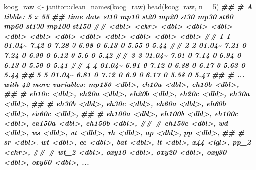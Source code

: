 \documentclass[
]{article}
\newenvironment{Shaded}{\begin{snugshade}}{\end{snugshade}}
\newcommand{\AttributeTok}[1]{\textcolor[rgb]{0.77,0.63,0.00}{#1}}
\newcommand{\DecValTok}[1]{\textcolor[rgb]{0.00,0.00,0.81}{#1}}
\newcommand{\DocumentationTok}[1]{\textcolor[rgb]{0.56,0.35,0.01}{\textbf{\textit{#1}}}}
\newcommand{\FunctionTok}[1]{\textcolor[rgb]{0.00,0.00,0.00}{#1}}
\newcommand{\NormalTok}[1]{#1}
\newcommand{\OtherTok}[1]{\textcolor[rgb]{0.56,0.35,0.01}{#1}}
\newcommand{\SpecialCharTok}[1]{\textcolor[rgb]{0.00,0.00,0.00}{#1}}
\begin{document}
\begin{Shaded}
\begin{Highlighting}[]
\NormalTok{koog\_raw }\OtherTok{\textless{}{-}}\NormalTok{ janitor}\SpecialCharTok{::}\FunctionTok{clean\_names}\NormalTok{(koog\_raw)}
\FunctionTok{head}\NormalTok{(koog\_raw, }\AttributeTok{n =} \DecValTok{5}\NormalTok{)}
\DocumentationTok{\#\# \# A tibble: 5 x 55}
\DocumentationTok{\#\#    time date    st10  mp10  st20  mp20  st30  mp30  st60  mp60 st100 mp100 st150}
\DocumentationTok{\#\#   \textless{}dbl\textgreater{} \textless{}chr\textgreater{}  \textless{}dbl\textgreater{} \textless{}dbl\textgreater{} \textless{}dbl\textgreater{} \textless{}dbl\textgreater{} \textless{}dbl\textgreater{} \textless{}dbl\textgreater{} \textless{}dbl\textgreater{} \textless{}dbl\textgreater{} \textless{}dbl\textgreater{} \textless{}dbl\textgreater{} \textless{}dbl\textgreater{}}
\DocumentationTok{\#\# 1     1 01.04\textasciitilde{}  7.42     0  7.28     0  6.98     0  6.13     0  5.55     0  5.44}
\DocumentationTok{\#\# 2     2 01.04\textasciitilde{}  7.21     0  7.24     0  6.99     0  6.12     0  5.6      0  5.42}
\DocumentationTok{\#\# 3     3 01.04\textasciitilde{}  7.01     0  7.14     0  6.94     0  6.13     0  5.59     0  5.41}
\DocumentationTok{\#\# 4     4 01.04\textasciitilde{}  6.91     0  7.12     0  6.88     0  6.17     0  5.63     0  5.44}
\DocumentationTok{\#\# 5     5 01.04\textasciitilde{}  6.81     0  7.12     0  6.9      0  6.17     0  5.58     0  5.47}
\DocumentationTok{\#\# \# ... with 42 more variables: mp150 \textless{}dbl\textgreater{}, eh10a \textless{}dbl\textgreater{}, eh10b \textless{}dbl\textgreater{},}
\DocumentationTok{\#\# \#   eh10c \textless{}dbl\textgreater{}, eh20a \textless{}dbl\textgreater{}, eh20b \textless{}dbl\textgreater{}, eh20c \textless{}dbl\textgreater{}, eh30a \textless{}dbl\textgreater{},}
\DocumentationTok{\#\# \#   eh30b \textless{}dbl\textgreater{}, eh30c \textless{}dbl\textgreater{}, eh60a \textless{}dbl\textgreater{}, eh60b \textless{}dbl\textgreater{}, eh60c \textless{}dbl\textgreater{},}
\DocumentationTok{\#\# \#   eh100a \textless{}dbl\textgreater{}, eh100b \textless{}dbl\textgreater{}, eh100c \textless{}dbl\textgreater{}, eh150a \textless{}dbl\textgreater{}, eh150b \textless{}dbl\textgreater{},}
\DocumentationTok{\#\# \#   eh150c \textless{}dbl\textgreater{}, wd \textless{}dbl\textgreater{}, ws \textless{}dbl\textgreater{}, at \textless{}dbl\textgreater{}, rh \textless{}dbl\textgreater{}, ap \textless{}dbl\textgreater{}, pp \textless{}dbl\textgreater{},}
\DocumentationTok{\#\# \#   sr \textless{}dbl\textgreater{}, wt \textless{}dbl\textgreater{}, ec \textless{}dbl\textgreater{}, bat \textless{}dbl\textgreater{}, lt \textless{}dbl\textgreater{}, x44 \textless{}lgl\textgreater{}, pp\_2 \textless{}chr\textgreater{},}
\DocumentationTok{\#\# \#   wt\_2 \textless{}dbl\textgreater{}, oxy10 \textless{}dbl\textgreater{}, oxy20 \textless{}dbl\textgreater{}, oxy30 \textless{}dbl\textgreater{}, oxy60 \textless{}dbl\textgreater{}, ...}
\end{Highlighting}
\end{Shaded}
\end{document}
